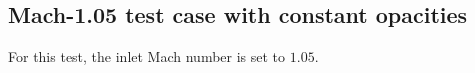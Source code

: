 \documentclass[times,doublespace]{fldauth}%
\begin{document}
\subsection{Mach-1.05 test case with constant opacities}\label{sec:mach-1p05-cst-xs}
%
For this test, the inlet Mach number is set to $1.05$.
\end{document}
